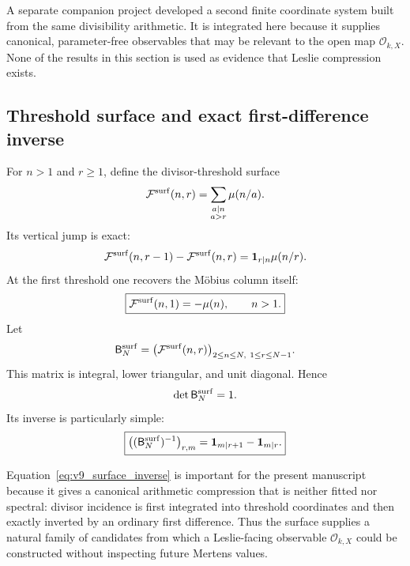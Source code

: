 \documentclass[11pt]{amsart}
\numberwithin{equation}{section}
\theoremstyle{plain}
\theoremstyle{definition}
\theoremstyle{remark}
\begin{document}
A separate companion project developed a second finite coordinate system built from the same
divisibility arithmetic.  It is integrated here because it supplies canonical, parameter-free
observables that may be relevant to the open map $\mathcal O_{k,X}$.  None of the results in
this section is used as evidence that Leslie compression exists.

\subsection{Threshold surface and exact first-difference inverse}

For $n>1$ and $r\ge1$, define the divisor-threshold surface
\begin{equation}
\mathcal F^{\rm surf}(n,r)
=
\sum_{\substack{a\mid n\\a>r}}\mu(n/a).
\label{eq:v9_surface_threshold}
\end{equation}
Its vertical jump is exact:
\begin{equation}
\mathcal F^{\rm surf}(n,r-1)-\mathcal F^{\rm surf}(n,r)
=
\mathbf1_{r\mid n}\mu(n/r).
\label{eq:v9_surface_vertical_jump}
\end{equation}
At the first threshold one recovers the M\"obius column itself:
\begin{equation}
\boxed{\mathcal F^{\rm surf}(n,1)=-\mu(n),\qquad n>1.}
\label{eq:v9_surface_mobius_column}
\end{equation}
Let
\begin{equation}
\mathsf B_N^{\rm surf}
=
\bigl(\mathcal F^{\rm surf}(n,r)\bigr)_
{2\le n\le N,\ 1\le r\le N-1}.
\label{eq:v9_surface_matrix}
\end{equation}
This matrix is integral, lower triangular, and unit diagonal.  Hence
\begin{equation}
\det \mathsf B_N^{\rm surf}=1.
\label{eq:v9_surface_unimodular}
\end{equation}
Its inverse is particularly simple:
\begin{equation}
\boxed{
\bigl((\mathsf B_N^{\rm surf})^{-1}\bigr)_{r,m}
=
\mathbf1_{m\mid r+1}-\mathbf1_{m\mid r}.
}
\label{eq:v9_surface_inverse}
\end{equation}

Equation~\eqref{eq:v9_surface_inverse} is important for the present manuscript because it gives
a canonical arithmetic compression that is neither fitted nor spectral: divisor incidence is
first integrated into threshold coordinates and then exactly inverted by an ordinary first
difference.  Thus the surface supplies a natural family of candidates from which a
Leslie-facing observable $\mathcal O_{k,X}$ could be constructed without inspecting future
Mertens values.
\end{document}
